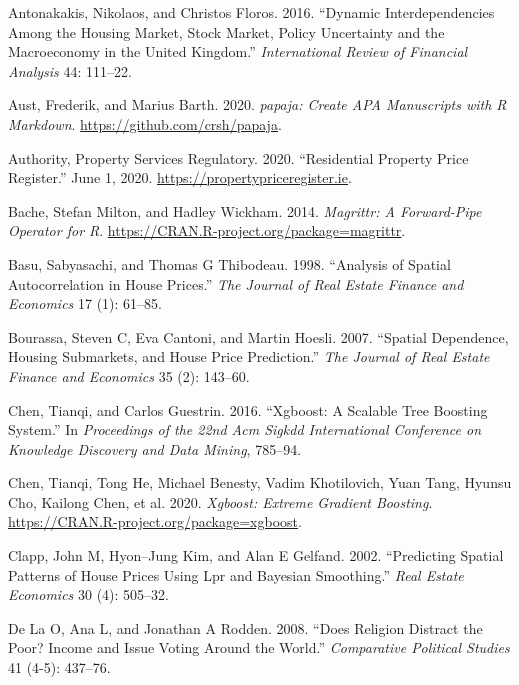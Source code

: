 \documentclass[conference,final,]{IEEEtran}
\newlength{\cslhangindent}
\newenvironment{cslreferences}%
  {\setlength{\parindent}{0pt}%
  \everypar{\setlength{\hangindent}{\cslhangindent}}\ignorespaces}%
  {\par}
\begin{document}
\hypertarget{refs}{}
\begin{cslreferences}
\leavevmode\hypertarget{ref-antonakakis2016dynamic}{}%
Antonakakis, Nikolaos, and Christos Floros. 2016. ``Dynamic Interdependencies Among the Housing Market, Stock Market, Policy Uncertainty and the Macroeconomy in the United Kingdom.'' \emph{International Review of Financial Analysis} 44: 111--22.

\leavevmode\hypertarget{ref-R-papaja}{}%
Aust, Frederik, and Marius Barth. 2020. \emph{papaja: Create APA Manuscripts with R Markdown}. \url{https://github.com/crsh/papaja}.

\leavevmode\hypertarget{ref-rppr2020}{}%
Authority, Property Services Regulatory. 2020. ``Residential Property Price Register.'' June 1, 2020. \url{https://propertypriceregister.ie}.

\leavevmode\hypertarget{ref-R-magrittr}{}%
Bache, Stefan Milton, and Hadley Wickham. 2014. \emph{Magrittr: A Forward-Pipe Operator for R}. \url{https://CRAN.R-project.org/package=magrittr}.

\leavevmode\hypertarget{ref-basu1998analysis}{}%
Basu, Sabyasachi, and Thomas G Thibodeau. 1998. ``Analysis of Spatial Autocorrelation in House Prices.'' \emph{The Journal of Real Estate Finance and Economics} 17 (1): 61--85.

\leavevmode\hypertarget{ref-bourassa2007spatial}{}%
Bourassa, Steven C, Eva Cantoni, and Martin Hoesli. 2007. ``Spatial Dependence, Housing Submarkets, and House Price Prediction.'' \emph{The Journal of Real Estate Finance and Economics} 35 (2): 143--60.

\leavevmode\hypertarget{ref-chen2016xgboost}{}%
Chen, Tianqi, and Carlos Guestrin. 2016. ``Xgboost: A Scalable Tree Boosting System.'' In \emph{Proceedings of the 22nd Acm Sigkdd International Conference on Knowledge Discovery and Data Mining}, 785--94.

\leavevmode\hypertarget{ref-R-xgboost}{}%
Chen, Tianqi, Tong He, Michael Benesty, Vadim Khotilovich, Yuan Tang, Hyunsu Cho, Kailong Chen, et al. 2020. \emph{Xgboost: Extreme Gradient Boosting}. \url{https://CRAN.R-project.org/package=xgboost}.

\leavevmode\hypertarget{ref-clapp2002predicting}{}%
Clapp, John M, Hyon--Jung Kim, and Alan E Gelfand. 2002. ``Predicting Spatial Patterns of House Prices Using Lpr and Bayesian Smoothing.'' \emph{Real Estate Economics} 30 (4): 505--32.

\leavevmode\hypertarget{ref-de2008does}{}%
De La O, Ana L, and Jonathan A Rodden. 2008. ``Does Religion Distract the Poor? Income and Issue Voting Around the World.'' \emph{Comparative Political Studies} 41 (4-5): 437--76.


\end{cslreferences}
\end{document}
